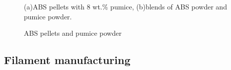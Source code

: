 \begin{figure}[htbp] %
	\centering

  \caption{ABS pellets and pumice powder}{\footnotesize  (a)ABS pellets with 8 wt.$\%$ pumice, (b)blends of ABS powder and pumice powder.}
  \label{Fig:powder}
\end{figure}

\subsection{Filament manufacturing}

